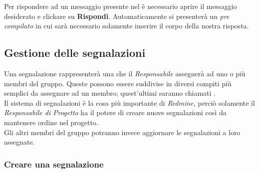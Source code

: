 \documentclass{scalatekids-article}
\begin{document}
Per rispondere ad un messaggio presente nel  è necessario aprire il messaggio desiderato e clickare su \textbf{Rispondi}. Automaticamente si presenterà un  \textit{pre compilato} in cui sarà necessario solamente inserire il corpo della nostra risposta.

\subsection{Gestione delle segnalazioni}

Una segnalazione rappresenterà una  che il \textit{Responsabile} assegnerà ad uno o più membri del gruppo. Queste  possono essere suddivise in diversi compiti più semplici da assegnare ad un membro; quest'ultimi saranno chiamati .\\
Il sistema di segnalazioni è la cosa più importante di \textit{Redmine}, perciò solamente il \textit{Responsabile di Progetto} ha il potere di creare nuove segnalazioni così da mantenere ordine nel progetto. \\Gli altri membri del gruppo potranno invece aggiornare le segnalazioni a loro assegnate.

\subsubsection{Creare una segnalazione}
\end{document}
